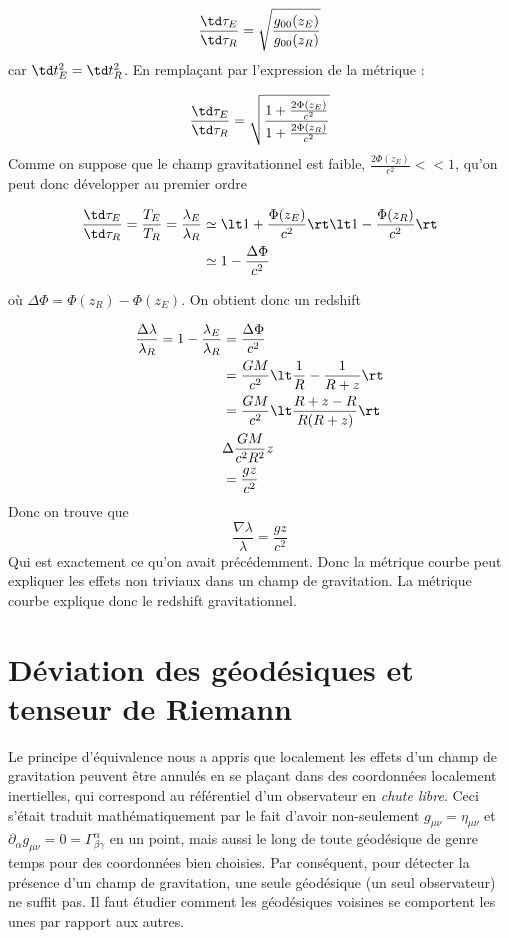 \begin{equation}
    \frac{\td \tau_E}{\td \tau_R} = \sqrt{\frac{g_{00}(z_E)}{g_{00}(z_R)}}
\end{equation}
car $\td t^2_E = \td t^2_R$. En remplaçant par l'expression de la métrique :


\begin{equation}
     \frac{\td \tau_E}{\td \tau_R} = \sqrt{\frac{1+\frac{2\Phi(z_E)}{c^2}}{1+\frac{2\Phi(z_R)}{c^2}}}
\end{equation}
Comme on suppose que le champ gravitationnel est faible, $\frac{2\Phi(z_E)}{c^2} << 1$, qu'on peut donc développer au premier ordre 

\begin{align}
     \frac{\td \tau_E}{\td \tau_R} = \frac{T_E}{T_R} = \frac{\lambda_E}{\lambda_R} &\simeq \lt 1 +\frac{\Phi(z_E)}{c^2}\rt \lt 1-\frac{\Phi(z_R)}{c^2} \rt\\
     & \simeq 1 - \frac{\Delta \Phi}{c^2}
\end{align}

où $\Delta\Phi = \Phi(z_R) - \Phi(z_E)$. On obtient donc un redshift

\begin{align}
    \frac{\Delta \lambda}{\lambda_R} = 1 - \frac{\lambda_E}{\lambda_R} &= \frac{\Delta\Phi}{c^2}  \\
    &= \frac{GM}{c^2}\lt\frac{1}{R} -\frac{1}{R+z}\rt\\
    &= \frac{GM}{c^2}\lt \frac{R + z - R}{R(R+z)}\rt\\
    & \Delta \frac{GM}{c^2 R^2}z\\
    &=\frac{gz}{c^2}
\end{align}
Donc on trouve que 
\begin{equation}
    \frac{\nabla \lambda}{\lambda} = \frac{gz}{c^2}
\end{equation}
Qui est exactement ce qu'on avait précédemment. Donc la métrique courbe peut expliquer les effets non triviaux dans un champ de gravitation. La métrique courbe explique donc le redshift gravitationnel. 

\section{Déviation des géodésiques et tenseur de Riemann}

Le principe d'équivalence nous a appris que localement les effets d'un champ de gravitation peuvent être annulés en se plaçant dans des coordonnées localement inertielles, qui correspond au référentiel d'un observateur en \emph{chute libre}. Ceci s'était traduit mathématiquement par le fait d'avoir non-seulement $g_{\mu \nu} = \eta_{\mu \nu}$ et $\partial_{\alpha}g_{\mu \nu} = 0 = \Gamma^{\alpha}_{\beta \gamma}$ en un point, mais aussi le long de toute géodésique de genre temps pour des coordonnées bien choisies. Par conséquent, pour détecter la présence d'un champ de gravitation, une seule géodésique (un seul observateur) ne suffit pas. Il faut étudier comment les géodésiques voisines se comportent les unes par rapport aux autres. 

